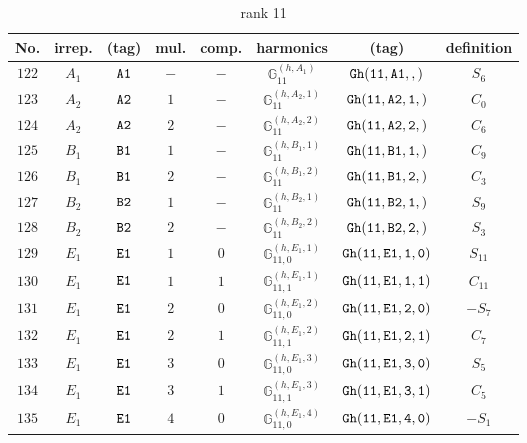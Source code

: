 \documentclass[fleqn,8pt]{jsarticle}
\begin{document}
\begin{table}[ht!]
\begin{center}
\caption{rank 11}
\renewcommand{\arraystretch}{1.3}
\begin{tabular}{cccccccc} \hline \hline
No. & irrep. & (tag) & mul. & comp. & harmonics & (tag) & definition \\ \hline
$ 122 $ & $ A_{1} $ & $ {\tt A1} $ & $ - $ & $ - $ & $ \mathbb{G}_{11}^{(h,A_{1})} $ & $ {\tt Gh(11,A1,,)} $ & $ S_{6} $ \\
$ 123 $ & $ A_{2} $ & $ {\tt A2} $ & $ 1 $ & $ - $ & $ \mathbb{G}_{11}^{(h,A_{2},1)} $ & $ {\tt Gh(11,A2,1,)} $ & $ C_{0} $ \\
$ 124 $ & $ A_{2} $ & $ {\tt A2} $ & $ 2 $ & $ - $ & $ \mathbb{G}_{11}^{(h,A_{2},2)} $ & $ {\tt Gh(11,A2,2,)} $ & $ C_{6} $ \\
$ 125 $ & $ B_{1} $ & $ {\tt B1} $ & $ 1 $ & $ - $ & $ \mathbb{G}_{11}^{(h,B_{1},1)} $ & $ {\tt Gh(11,B1,1,)} $ & $ C_{9} $ \\
$ 126 $ & $ B_{1} $ & $ {\tt B1} $ & $ 2 $ & $ - $ & $ \mathbb{G}_{11}^{(h,B_{1},2)} $ & $ {\tt Gh(11,B1,2,)} $ & $ C_{3} $ \\
$ 127 $ & $ B_{2} $ & $ {\tt B2} $ & $ 1 $ & $ - $ & $ \mathbb{G}_{11}^{(h,B_{2},1)} $ & $ {\tt Gh(11,B2,1,)} $ & $ S_{9} $ \\
$ 128 $ & $ B_{2} $ & $ {\tt B2} $ & $ 2 $ & $ - $ & $ \mathbb{G}_{11}^{(h,B_{2},2)} $ & $ {\tt Gh(11,B2,2,)} $ & $ S_{3} $ \\
$ 129 $ & $ E_{1} $ & $ {\tt E1} $ & $ 1 $ & $ 0 $ & $ \mathbb{G}_{11,0}^{(h,E_{1},1)} $ & $ {\tt Gh(11,E1,1,0)} $ & $ S_{11} $ \\
$ 130 $ & $ E_{1} $ & $ {\tt E1} $ & $ 1 $ & $ 1 $ & $ \mathbb{G}_{11,1}^{(h,E_{1},1)} $ & $ {\tt Gh(11,E1,1,1)} $ & $ C_{11} $ \\
$ 131 $ & $ E_{1} $ & $ {\tt E1} $ & $ 2 $ & $ 0 $ & $ \mathbb{G}_{11,0}^{(h,E_{1},2)} $ & $ {\tt Gh(11,E1,2,0)} $ & $ - S_{7} $ \\
$ 132 $ & $ E_{1} $ & $ {\tt E1} $ & $ 2 $ & $ 1 $ & $ \mathbb{G}_{11,1}^{(h,E_{1},2)} $ & $ {\tt Gh(11,E1,2,1)} $ & $ C_{7} $ \\
$ 133 $ & $ E_{1} $ & $ {\tt E1} $ & $ 3 $ & $ 0 $ & $ \mathbb{G}_{11,0}^{(h,E_{1},3)} $ & $ {\tt Gh(11,E1,3,0)} $ & $ S_{5} $ \\
$ 134 $ & $ E_{1} $ & $ {\tt E1} $ & $ 3 $ & $ 1 $ & $ \mathbb{G}_{11,1}^{(h,E_{1},3)} $ & $ {\tt Gh(11,E1,3,1)} $ & $ C_{5} $ \\
$ 135 $ & $ E_{1} $ & $ {\tt E1} $ & $ 4 $ & $ 0 $ & $ \mathbb{G}_{11,0}^{(h,E_{1},4)} $ & $ {\tt Gh(11,E1,4,0)} $ & $ - S_{1} $ \\

\end{tabular}
\end{center}
\end{table}
\end{document}
